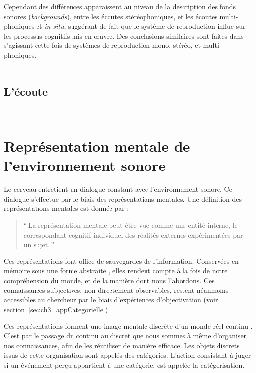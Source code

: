 Cependant des différences apparaissent au niveau de la description des fonds sonores (\emph{backgrounds}), entre les écoutes stéréophoniques, et les écoutes multi-phoniques et \emph{in situ}, suggérant de fait que le système de reproduction influe sur les processus cognitifs mis en œuvre. Des conclusions similaires sont faites dans \citep{guastavino2004perceptual} s'agissant cette fois de systèmes de reproduction mono, stéréo, et multi-phoniques. \\

 \\

\subsection{L'écoute}
\label{sec:ch3_ecoute}

\\

\section{Représentation mentale de l'environnement sonore}
\label{sec:ch3_representationMentale}
 
 
Le cerveau entretient un dialogue constant avec l'environnement sonore. Ce dialogue s'effectue par le biais des représentations mentales. Une définition des représentations mentales est donnée par \citep{houde1998vocabulaire}:

\begin{quote}
``\,La représentation mentale peut être vue comme une entité interne, le correspondant cognitif individuel des réalités externes expérimentées par un sujet.\,''
\end{quote}

Ces représentations font office de sauvegardes de l'information. Conservées en mémoire sous une forme abstraite \citep[p. 357]{mcadams1994penser}, elles rendent compte à la fois de notre compréhension du monde, et de la manière dont nous l'abordons. Ces connaissances subjectives, non directement observables, restent néanmoins accessibles au chercheur par le biais d'expériences d'objectivation (voir section~\ref{sec:ch3_appCategorielle})
 
Ces représentations forment une image mentale discrète d'un monde réel continu \citep{houde1998vocabulaire}. C'est par le passage du continu au discret que nous sommes à même d'organiser nos connaissances, afin de les réutiliser de manière efficace. Les objets discrets issus de cette organisation sont appelés des catégories. L'action consistant à juger si un événement perçu appartient à une catégorie, est appelée la catégorisation.

